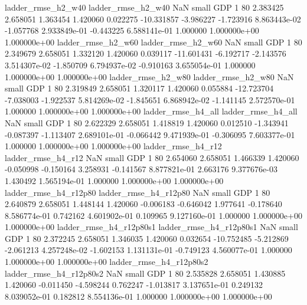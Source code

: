       ladder_rmse_h2_w40       ladder_rmse_h2_w40                   NaN      small      GDP                 1 80 2.383425       2.658051 1.363454       1.420060    0.022275    -10.331857     -3.986227    -1.723916   8.863443e-02 -1.057768 2.933849e-01    -0.443225   6.588141e-01            1.000000    1.000000e+00        1.000000e+00
      ladder_rmse_h2_w60       ladder_rmse_h2_w60                   NaN      small      GDP                 1 80 2.349679       2.658051 1.332120       1.420060    0.039117    -11.601431     -6.192717    -2.143576   3.514307e-02 -1.850709 6.794937e-02    -0.910163   3.655054e-01            1.000000    1.000000e+00        1.000000e+00
      ladder_rmse_h2_w80       ladder_rmse_h2_w80                   NaN      small      GDP                 1 80 2.319849       2.658051 1.320117       1.420060    0.055884    -12.723704     -7.038003    -1.922537   5.814269e-02 -1.845651 6.868942e-02    -1.141145   2.572570e-01            1.000000    1.000000e+00        1.000000e+00
      ladder_rmse_h4_all       ladder_rmse_h4_all                   NaN      small      GDP                 1 80 2.622329       2.658051 1.418819       1.420060    0.012510     -1.343941     -0.087397    -1.113407   2.689101e-01 -0.066442 9.471939e-01    -0.306095   7.603377e-01            1.000000    1.000000e+00        1.000000e+00
      ladder_rmse_h4_r12       ladder_rmse_h4_r12                   NaN      small      GDP                 1 80 2.654060       2.658051 1.466339       1.420060   -0.050998     -0.150164      3.258931    -0.141567   8.877821e-01  2.663176 9.377676e-03     1.430492   1.565194e-01            1.000000    1.000000e+00        1.000000e+00
   ladder_rmse_h4_r12p80    ladder_rmse_h4_r12p80                   NaN      small      GDP                 1 80 2.640879       2.658051 1.448144       1.420060   -0.006183     -0.646042      1.977641    -0.178640   8.586774e-01  0.742162 4.601902e-01     0.109965   9.127160e-01            1.000000    1.000000e+00        1.000000e+00
 ladder_rmse_h4_r12p80s1  ladder_rmse_h4_r12p80s1                   NaN      small      GDP                 1 80 2.372245       2.658051 1.346035       1.420060    0.032654    -10.752485     -5.212869    -2.061213   4.257248e-02 -1.602153 1.131131e-01    -0.749123   4.560077e-01            1.000000    1.000000e+00        1.000000e+00
 ladder_rmse_h4_r12p80s2  ladder_rmse_h4_r12p80s2                   NaN      small      GDP                 1 80 2.535828       2.658051 1.430885       1.420060   -0.011450     -4.598244      0.762247    -1.013817   3.137651e-01  0.249132 8.039052e-01     0.182812   8.554136e-01            1.000000    1.000000e+00        1.000000e+00
